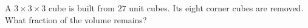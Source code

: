 A $3\times3\times3$ cube is built from $27$ unit cubes. Its eight corner cubes are removed. What fraction of the volume remains?

